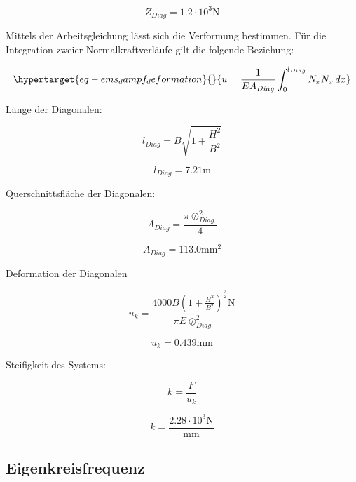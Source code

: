 \documentclass[
  letterpaper,
  DIV=11]{scrreprt}
\begin{document}
\begin{equation}Z_{Diag} = 1.2 \cdot 10^{3} \text{N}\end{equation}

Mittels der Arbeitsgleichung lässt sich die Verformung bestimmen. Für
die Integration zweier Normalkraftverläufe gilt die folgende Beziehung:

\begin{equation}\protect\hypertarget{eq-ems_dampf_deformation}{}{
u = \frac{1}{EA_{Diag}}  \int_{0}^{l_{Diag}} N_x\bar{N_x} \,dx
}\label{eq-ems_dampf_deformation}\end{equation}

Länge der Diagonalen:

\begin{equation}l_{Diag} = B \sqrt{1 + \frac{H^{2}}{B^{2}}}\end{equation}

\begin{equation}l_{Diag} = 7.21 \text{m}\end{equation}

Querschnittsfläche der Diagonalen:

\begin{equation}A_{Diag} = \frac{\pi \oslash_{Diag}^{2}}{4}\end{equation}

\begin{equation}A_{Diag} = 113.0 \text{mm}^{2}\end{equation}

Deformation der Diagonalen

\begin{equation}u_{k} = \frac{4000 B \left(1 + \frac{H^{2}}{B^{2}}\right)^{\frac{3}{2}} \text{N}}{\pi E \oslash_{Diag}^{2}}\end{equation}

\begin{equation}u_{k} = 0.439 \text{mm}\end{equation}

Steifigkeit des Systems:

\begin{equation}k = \frac{F}{u_{k}}\end{equation}

\begin{equation}k = \frac{2.28 \cdot 10^{3} \text{N}}{\text{mm}}\end{equation}

\hypertarget{eigenkreisfrequenz-5}{%
\subsection{Eigenkreisfrequenz}\label{eigenkreisfrequenz-5}}
\end{document}
